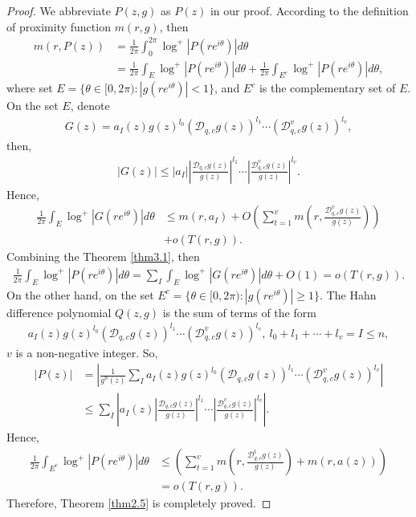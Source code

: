 \documentclass[10pt,a4paper]{amsart}
\theoremstyle{plain}
\theoremstyle{definition}
\theoremstyle{remark}
\begin{document}
\begin{proof}
	\indent We abbreviate \(P(z,g)\) as \(P(z)\) in our proof. According to the definition of proximity function \(m(r,g)\), then
	\begin{align*}
		m(r,P(z))&=\frac{1}{2\pi}\int_{0}^{2\pi}\log^{+}|P(re^{i\theta})|d\theta\\
		&=\frac{1}{2\pi}\int_{E}\log^{+}|P(re^{i\theta})|d\theta+\frac{1}{2\pi}\int_{E^{c}}\log^{+}|P(re^{i\theta})|d\theta,
	\end{align*}
	where set \(E=\{\theta\in[0,2\pi):|g(re^{i\theta})|<1\}\), and \(E^{c}\) is the complementary set of \(E\). On the set \(E\), denote
	\begin{align*}
		G(z)=a_{I}(z)g(z)^{l_{0}}(\mathcal{D}_{q,c}g(z))^{l_{1}}\cdots(\mathcal{D}^{v}_{q,c}g(z))^{l_{v}},
	\end{align*}
	then,
	\begin{align*}
		|G(z)|\leq|a_{I}|\left|\frac{\mathcal{D}_{q,c}g(z)}{g(z)}\right|^{l_{1}}\cdots\left|\frac{\mathcal{D}^{v}_{q,c}g(z)}{g(z)}\right|^{l_{v}}.
	\end{align*}
	Hence,
	\begin{align*}
		\frac{1}{2\pi}\int_{E}\log^{+}|G(re^{i\theta})|d\theta&\leq m(r,a_{I})+O\left(\sum_{t=1}^{v}m\left(r,\frac{\mathcal{D}^{v}_{q,c}g(z)}{g(z)}\right)\right)\\
		&+o(T(r,g)).
	\end{align*}
	Combining the Theorem \ref{thm3.1}, then
	\begin{align*}
		\frac{1}{2\pi}\int_{E}\log^{+}|P(re^{i\theta})|d\theta=\sum_{I}\int_{E}\log^{+}|G(re^{i\theta})|d\theta+O(1)=o(T(r,g)).
	\end{align*}
	\indent On the other hand, on the set \(E^{c}=\{\theta\in[0,2\pi):|g(re^{i\theta})|\geq1\}\). The Hahn difference polynomial \(Q(z,g)\) is the sum of terms of the form
	\begin{align*}
		a_{I}(z)g(z)^{l_{0}}(\mathcal{D}_{q,c}g(z))^{l_{1}}\cdots(\mathcal{D}^{v}_{q,c}g(z))^{l_{v}},~l_{0}+l_{1}+\cdots+l_{v}=I\leq n,
	\end{align*}
	\(v\) is a non-negative integer. So,
	\begin{align*}
		|P(z)|&=\left|\frac{1}{g^{n}(z)}\sum_{I}a_{I}(z)g(z)^{l_{0}}(\mathcal{D}_{q,c}g(z))^{l_{1}}\cdots(\mathcal{D}^{v}_{q,c}g(z))^{l_{v}}\right|\\
		&\leq\sum_{I}\left|a_{I}(z)\left|\frac{\mathcal{D}_{q,c}g(z)}{g(z)}\right|^{l_{1}}\cdots
		\left|\frac{\mathcal{D}^{v}_{q,c}g(z)}{g(z)}\right|^{l_{v}}\right|.
	\end{align*}
	Hence,
	\begin{align*}
		 \frac{1}{2\pi}\int_{E^{c}}\log^{+}|P(re^{i\theta})|d\theta&\leq\left(\sum_{t=1}^{v}m\left(r,\frac{\mathcal{D}^{t}_{q,c}g(z)}{g(z)}\right)+m(r,a(z))\right)\\
		&=o(T(r,g)).
	\end{align*}
	Therefore, Theorem \ref{thm2.5} is completely proved.
\end{proof}
\end{document}
